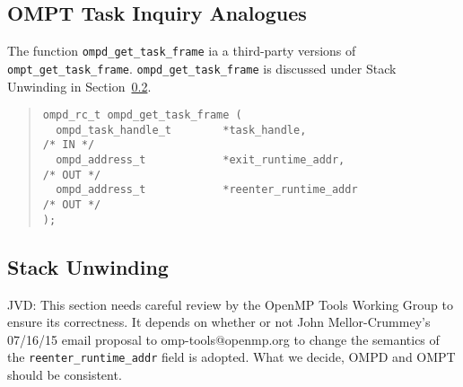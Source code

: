 %
\subsection{OMPT Task Inquiry Analogues}
%
The function \verb|ompd_get_task_frame|
ia a third-party versions of \verb|ompt_get_task_frame|.
%
\texttt{ompd\_get\_task\_frame} is discussed under Stack Unwinding in
Section~\ref{stack-unwinding:sec}.
%
\begin{quote}
\begin{lstlisting}
ompd_rc_t ompd_get_task_frame (
  ompd_task_handle_t        *task_handle,                           /* IN */
  ompd_address_t            *exit_runtime_addr,                    /* OUT */
  ompd_address_t            *reenter_runtime_addr                  /* OUT */
);
\end{lstlisting}
\end{quote}
%

%
\subsection{Stack Unwinding}
\label{stack-unwinding:sec}
%
\begin{notes}
JVD: This section needs careful review by the OpenMP Tools Working
Group to ensure its correctness.  It depends on whether or not John
Mellor-Crummey's 07/16/15 email proposal to omp-tools@openmp.org to
change the semantics of the \verb|reenter_runtime_addr| field is
adopted.  What we decide, OMPD and OMPT should be consistent.
\end{notes}

